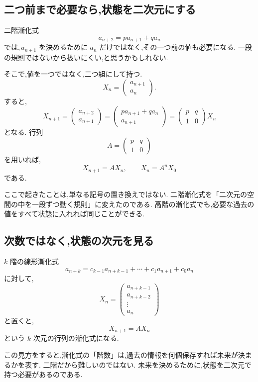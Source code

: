 \subsection{二つ前まで必要なら,状態を二次元にする}

二階漸化式
\[
  a_{n+2}=p a_{n+1}+q a_n
\]
では,\,$a_{n+1}$ を決めるために $a_n$ だけではなく,その一つ前の値も必要になる.
一段の規則ではないから扱いにくい,と思うかもしれない.

そこで,値を一つではなく,二つ組にして持つ.
\[
  X_n=
  \begin{pmatrix}
    a_{n+1}\\
    a_n
  \end{pmatrix}.
\]
すると,
\[
  X_{n+1}
  =
  \begin{pmatrix}
    a_{n+2}\\
    a_{n+1}
  \end{pmatrix}
  =
  \begin{pmatrix}
    p a_{n+1}+q a_n\\
    a_{n+1}
  \end{pmatrix}
  =
  \begin{pmatrix}
    p&q\\
    1&0
  \end{pmatrix}
  X_n
\]
となる.
行列
\[
  A=
  \begin{pmatrix}
    p&q\\
    1&0
  \end{pmatrix}
\]
を用いれば,
\[
  X_{n+1}=AX_n,\qquad X_n=A^nX_0
\]
である.

ここで起きたことは,単なる記号の置き換えではない.
二階漸化式を「二次元の空間の中を一段ずつ動く規則」に変えたのである.
高階の漸化式でも,必要な過去の値をすべて状態に入れれば同じことができる.

\subsection{次数ではなく,状態の次元を見る}

$k$ 階の線形漸化式
\[
  a_{n+k}=c_{k-1}a_{n+k-1}+\cdots+c_1a_{n+1}+c_0a_n
\]
に対して,
\[
  X_n=
  \begin{pmatrix}
    a_{n+k-1}\\
    a_{n+k-2}\\
    \vdots\\
    a_n
  \end{pmatrix}
\]
と置くと,
\[
  X_{n+1}=AX_n
\]
という $k$ 次元の行列の漸化式になる.

この見方をすると,漸化式の「階数」は,過去の情報を何個保存すれば未来が決まるかを表す.
二階だから難しいのではない.
未来を決めるために,状態を二次元で持つ必要があるのである.

